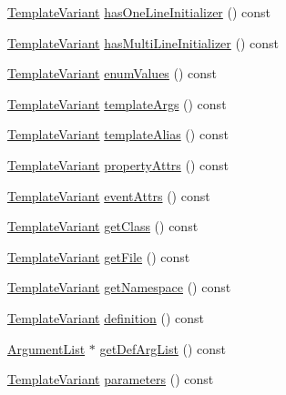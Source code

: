 \begin{DoxyCompactItemize}
\item 
\hyperlink{class_template_variant}{Template\+Variant} \hyperlink{class_member_context_1_1_private_a97c5c47569706eadb74ed2ed629308ed}{has\+One\+Line\+Initializer} () const 
\item 
\hyperlink{class_template_variant}{Template\+Variant} \hyperlink{class_member_context_1_1_private_a135947a8334e27e94bdeed845d8d757c}{has\+Multi\+Line\+Initializer} () const 
\item 
\hyperlink{class_template_variant}{Template\+Variant} \hyperlink{class_member_context_1_1_private_a5b9a837fbf49cd82dc82390efc5c6422}{enum\+Values} () const 
\item 
\hyperlink{class_template_variant}{Template\+Variant} \hyperlink{class_member_context_1_1_private_aa859a4ccfe6484b0ee4d2551a7cb7fb9}{template\+Args} () const 
\item 
\hyperlink{class_template_variant}{Template\+Variant} \hyperlink{class_member_context_1_1_private_aa53799d4e4d5cb8c87d1f576d3bfdad5}{template\+Alias} () const 
\item 
\hyperlink{class_template_variant}{Template\+Variant} \hyperlink{class_member_context_1_1_private_a587f07c259182f736b2ab817a41afdf8}{property\+Attrs} () const 
\item 
\hyperlink{class_template_variant}{Template\+Variant} \hyperlink{class_member_context_1_1_private_adcc61180d6fcf6500b09b9b26e01716e}{event\+Attrs} () const 
\item 
\hyperlink{class_template_variant}{Template\+Variant} \hyperlink{class_member_context_1_1_private_a0cbbae434e53f1d940fdaf6750359ac5}{get\+Class} () const 
\item 
\hyperlink{class_template_variant}{Template\+Variant} \hyperlink{class_member_context_1_1_private_acbdbda7ff7927af78b3d9aa22cf2357c}{get\+File} () const 
\item 
\hyperlink{class_template_variant}{Template\+Variant} \hyperlink{class_member_context_1_1_private_a49a5e95cef63e882b336cb7a0f52a1c8}{get\+Namespace} () const 
\item 
\hyperlink{class_template_variant}{Template\+Variant} \hyperlink{class_member_context_1_1_private_a680e856e5ee5ea14ffaecb8d316bfb64}{definition} () const 
\item 
\hyperlink{class_argument_list}{Argument\+List} $\ast$ \hyperlink{class_member_context_1_1_private_a5bf1041e9f97a4d9ab5fc404a50307ea}{get\+Def\+Arg\+List} () const 
\item 
\hyperlink{class_template_variant}{Template\+Variant} \hyperlink{class_member_context_1_1_private_aae6e5e0297b02f9baf61f79642a7df69}{parameters} () const 

\end{DoxyCompactItemize}
